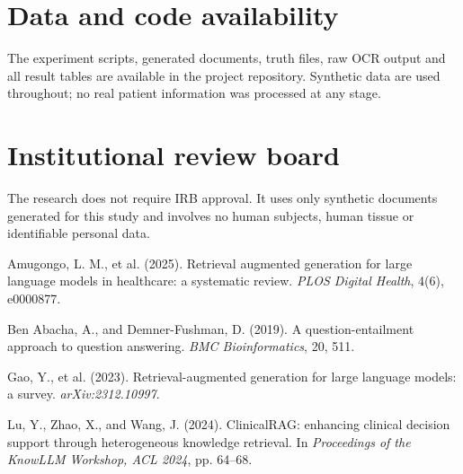 \documentclass[11pt]{article}
\newif\ifanon
\begin{document}
\section*{Data and code availability}

\ifanon
The experiment scripts, generated documents, truth files, raw OCR output and all result tables
are provided through an anonymised repository link with the submission. Synthetic data are used
throughout; no real patient information was processed at any stage.
\else
The experiment scripts, generated documents, truth files, raw OCR output and all result tables
are available in the project repository. Synthetic data are used throughout; no real patient
information was processed at any stage.
\fi

\section*{Institutional review board}

The research does not require IRB approval. It uses only synthetic documents generated for this
study and involves no human subjects, human tissue or identifiable personal data.

\begin{thebibliography}{9}
\small

Amugongo, L. M., et al. (2025).
Retrieval augmented generation for large language models in healthcare: a systematic review.
\emph{PLOS Digital Health}, 4(6), e0000877.

Ben Abacha, A., and Demner-Fushman, D. (2019).
A question-entailment approach to question answering.
\emph{BMC Bioinformatics}, 20, 511.

Gao, Y., et al. (2023).
Retrieval-augmented generation for large language models: a survey.
\emph{arXiv:2312.10997}.

Lu, Y., Zhao, X., and Wang, J. (2024).
ClinicalRAG: enhancing clinical decision support through heterogeneous knowledge retrieval.
In \emph{Proceedings of the KnowLLM Workshop, ACL 2024}, pp. 64--68.

\end{thebibliography}
\end{document}
